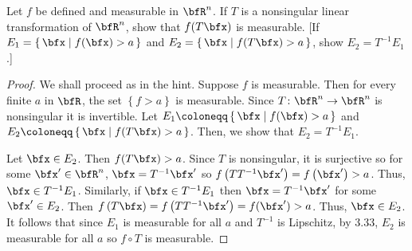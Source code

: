 \begin{problem}
Let $f$ be defined and measurable in $\bfR^n$. If $T$ is a nonsingular
linear transformation of $\bfR^n$, show that $f(T\bfx)$ is measurable. [If
$E_1=\left\{\,\bfx\;\middle|\; f(\bfx)>a\,\right\}$ and
$E_2=\left\{\,\bfx\;\middle|\;f(T\bfx)>a\,\right\}$, show $E_2=T^{-1}E_1$.]
\end{problem}
\begin{proof}
We shall proceed as in the hint. Suppose $f$ is measurable. Then for every
finite $a$ in $\bfR$, the set $\left\{f>a\right\}$ is measurable. Since
$T\colon\bfR^n\to\bfR^n$ is nonsingular it is invertible. Let
$E_1\coloneqq\left\{\,\bfx\;\middle|\; f(\bfx)>a\,\right\}$ and
$E_2\coloneqq\left\{\,\bfx\;\middle|\;f(T\bfx)>a\,\right\}$. Then, we show
that $E_2=T^{-1}E_1$.

Let $\bfx\in E_2$. Then $f(T\bfx)>a$. Since $T$ is nonsingular, it is
surjective so for some $\bfx'\in\bfR^n$, $\bfx=T^{-1}\bfx'$ so
$f\left(TT^{-1}\bfx'\right)=f\left(\bfx'\right)>a$. Thus, $\bfx\in
T^{-1}E_1$. Similarly, if $\bfx\in T^{-1}E_1$ then $\bfx=T^{-1}\bfx'$ for
some $\bfx'\in E_2$. Then
$f\left(T\bfx\right)=f\left(TT^{-1}\bfx'\right)=f(\bfx')>a$. Thus, $\bfx\in
E_2$. It follows that since $E_1$ is measurable for all $a$ and $T^{-1}$ is
Lipschitz, by 3.33, $E_2$ is measurable for all $a$ so $f\circ T$ is
measurable.
\end{proof}
\newpage

